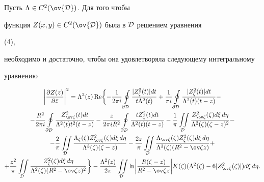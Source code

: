 \begin{cornonum} Пусть $\Lambda\in C^2(\ov{\cal D})$. Для того чтобы 


функция $Z(x,y)\in C^2(\ov{\cal D})$ была в $\cal D$ решением уравнения 


(4), 


необходимо и достаточно, чтобы она удовлетворяла следующему интегральному 


уравнению 


\begin{multline} 


\biggl|\frac{\partial Z(z)}{\partial\Bar z}\biggr|^2= 


\Lambda^2(z)\re\biggl\{-\frac{1}{2\pi i}\ointl_{\partial \cal D} 


\frac{|Z^2_\zeta(t)|dt}{t\Lambda^2(t)}+\frac{1}{\pi i} 


\ointl_{\partial\cal D} 


\frac{|Z^2_\zeta(t)|dt}{\Lambda^2(t)(t-z)}- \\ 


% 


-\frac{R^2}{2\pi i}\ointl_{\partial\cal D} 


\frac{Z^2_{\ov\zeta}(t)dt}{\Lambda^2(t)t^2(t-z)}- 


\frac{z}{2\pi iR^2}\ointl_{\partial\cal D} 


\frac{tZ^2_\zeta(t)dt}{\Lambda^2(t)(t-z)} - 


\frac{1}{\pi}\iintl_{\cal D} 


\frac{Z^2_{\ov\zeta}(\zeta)d\xi\,d\eta}{\Lambda^2(\zeta)(\zeta-z)^2}-\\ 


% 


-\frac{2}{\pi}\iintl_{\cal D} 


\frac{\Lambda_\zeta(\zeta)Z^2_{\ov\zeta}(\zeta)d\xi\,d\eta} 


{\Lambda^3(\zeta)(\zeta-z)} 


-\frac{2z}{\pi}\iintl_{\cal D} 


\frac{\Lambda_{\ov\zeta}(\zeta)Z^2_{\zeta}(\zeta)d\xi\,d\eta} 


{\Lambda^3(\zeta)(R^2-\ov\zeta z)}+\\ 


% 


+\frac{z^2}{\pi}\iintl_{\cal D} 


\frac{Z^2_\zeta(\zeta)d\xi\,d\eta} 


{\Lambda^2(\zeta)(R^2-\ov\zeta z)^2}\biggr\} 


-\frac{\Lambda^2(z)}{2\pi} 


\iintl_{\cal D}\ln\biggl| 


\frac{R(\zeta-z)}{R^2-\ov\zeta z}\biggr| 


K(\zeta)(\Lambda^2(\zeta)-6|Z^2_{\ov\zeta}(\zeta)|)d\xi\,d\eta. 


\end{multline} 


\end{cornonum} 


